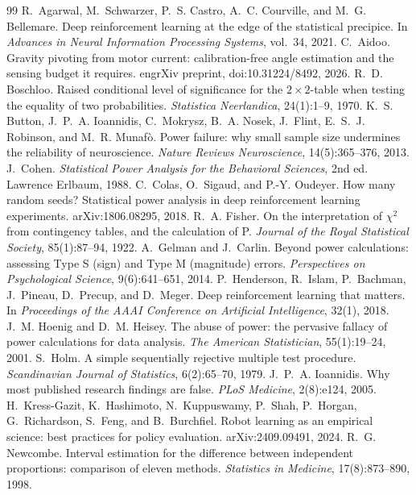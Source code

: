 \documentclass[11pt]{article}
\begin{document}
\begin{thebibliography}{99}\small
{} R.~Agarwal, M.~Schwarzer, P.~S. Castro, A.~C. Courville, and M.~G. Bellemare. Deep reinforcement learning at the edge of the statistical precipice. In \emph{Advances in Neural Information Processing Systems}, vol.~34, 2021.
 C.~Aidoo. Gravity pivoting from motor current: calibration-free angle estimation and the sensing budget it requires. engrXiv preprint, doi:10.31224/8492, 2026.
 R.~D. Boschloo. Raised conditional level of significance for the $2\times2$-table when testing the equality of two probabilities. \emph{Statistica Neerlandica}, 24(1):1--9, 1970.
 K.~S. Button, J.~P.~A. Ioannidis, C.~Mokrysz, B.~A. Nosek, J.~Flint, E.~S.~J. Robinson, and M.~R. Munaf\`o. Power failure: why small sample size undermines the reliability of neuroscience. \emph{Nature Reviews Neuroscience}, 14(5):365--376, 2013.
 J.~Cohen. \emph{Statistical Power Analysis for the Behavioral Sciences}, 2nd ed. Lawrence Erlbaum, 1988.
 C.~Colas, O.~Sigaud, and P.-Y. Oudeyer. How many random seeds? Statistical power analysis in deep reinforcement learning experiments. arXiv:1806.08295, 2018.
 R.~A. Fisher. On the interpretation of $\chi^2$ from contingency tables, and the calculation of P. \emph{Journal of the Royal Statistical Society}, 85(1):87--94, 1922.
 A.~Gelman and J.~Carlin. Beyond power calculations: assessing Type S (sign) and Type M (magnitude) errors. \emph{Perspectives on Psychological Science}, 9(6):641--651, 2014.
 P.~Henderson, R.~Islam, P.~Bachman, J.~Pineau, D.~Precup, and D.~Meger. Deep reinforcement learning that matters. In \emph{Proceedings of the AAAI Conference on Artificial Intelligence}, 32(1), 2018.
 J.~M. Hoenig and D.~M. Heisey. The abuse of power: the pervasive fallacy of power calculations for data analysis. \emph{The American Statistician}, 55(1):19--24, 2001.
 S.~Holm. A simple sequentially rejective multiple test procedure. \emph{Scandinavian Journal of Statistics}, 6(2):65--70, 1979.
 J.~P.~A. Ioannidis. Why most published research findings are false. \emph{PLoS Medicine}, 2(8):e124, 2005.
 H.~Kress-Gazit, K.~Hashimoto, N.~Kuppuswamy, P.~Shah, P.~Horgan, G.~Richardson, S.~Feng, and B.~Burchfiel. Robot learning as an empirical science: best practices for policy evaluation. arXiv:2409.09491, 2024.
 R.~G. Newcombe. Interval estimation for the difference between independent proportions: comparison of eleven methods. \emph{Statistics in Medicine}, 17(8):873--890, 1998.

\end{thebibliography}
\end{document}
